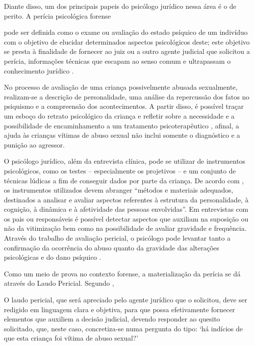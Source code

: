 Diante disso, um dos principais papeis do psicólogo jurídico nessa área é o de perito. A perícia psicológica forense

\begin{citacao}
	pode ser definida como o exame ou avaliação do estado psíquico de um indivíduo com o objetivo de elucidar determinados aspectos psicológicos deste; este objetivo se presta à finalidade de fornecer ao juiz ou a outro agente judicial que solicitou a perícia, informações técnicas que escapam ao senso comum e ultrapassam o conhecimento jurídico \cite[p. 36]{JUNG2006}.
\end{citacao}

No processo de avaliação de uma criança possivelmente abusada sexualmente, realizam-se a descrição de personalidade, uma análise da repercussão dos fatos no psiquismo e a compreensão dos acontecimentos. A partir disso, é possível traçar um esboço do retrato psicológico da criança e refletir sobre a necessidade e a possibilidade de encaminhamento a um tratamento psicoterapêutico , afinal, a ajuda às crianças vítimas de abuso sexual não inclui somente o diagnóstico e a punição ao agressor. 

O psicólogo jurídico, além da entrevista clínica, pode se utilizar de instrumentos psicológicos, como os testes -- especialmente os projetivos -- e um conjunto de técnicas lúdicas a fim de conseguir dados por parte da criança. De acordo com , os instrumentos utilizados devem abranger ``métodos e materiais adequados, destinados a analisar e avaliar aspectos referentes à estrutura da personalidade, à cognição, à dinâmica e à afetividade das pessoas envolvidas''. Em entrevistas com os pais ou responsáveis é possível detectar aspectos que auxiliam na suposição ou não da vitimização bem como na possibilidade de avaliar gravidade e frequência. 	Através do trabalho de avaliação pericial, o psicólogo pode levantar tanto a confirmação da ocorrência do abuso quanto da gravidade das alterações psicológicas e do dano psíquico \cite{JUNG2006}. 

Como um meio de prova no contexto forense, a materialização da perícia se dá através do Laudo Pericial. Segundo ,

\begin{citacao}
	O laudo pericial, que será apreciado pelo agente jurídico que o solicitou, deve ser redigido em linguagem clara e objetiva, para que possa efetivamente fornecer elementos que auxiliem a decisão judicial, devendo responder ao quesito solicitado, que, neste caso, concretiza-se numa pergunta do tipo: `há indícios de que esta criança foi vítima de abuso sexual?'
\end{citacao}


